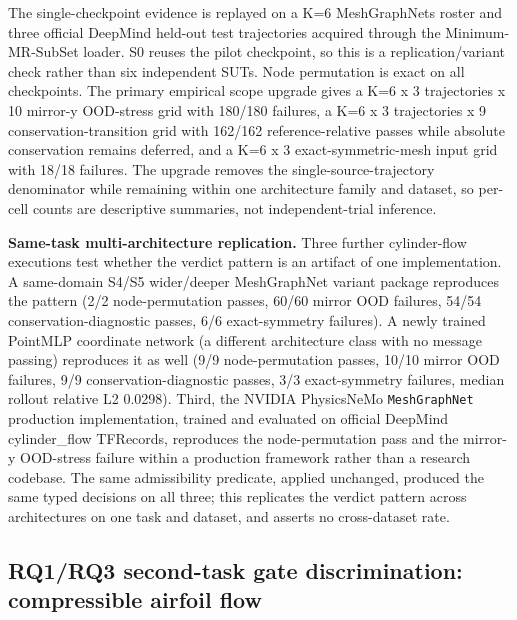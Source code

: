 \documentclass[preprint,12pt]{elsarticle}
\begin{document}
The single-checkpoint evidence is replayed on a K=6 MeshGraphNets roster and three official DeepMind held-out test trajectories acquired through the Minimum-MR-SubSet loader. S0 reuses the pilot checkpoint, so this is a replication/variant check rather than six independent SUTs. Node permutation is exact on all checkpoints. The primary empirical scope upgrade gives a K=6 x 3 trajectories x 10 mirror-y OOD-stress grid with 180/180 failures, a K=6 x 3 trajectories x 9 conservation-transition grid with 162/162 reference-relative passes while absolute conservation remains deferred, and a K=6 x 3 exact-symmetric-mesh input grid with 18/18 failures. The upgrade removes the single-source-trajectory denominator while remaining within one architecture family and dataset, so per-cell counts are descriptive summaries, not independent-trial inference.

\textbf{Same-task multi-architecture replication.} Three further cylinder-flow executions test whether the verdict pattern is an artifact of one implementation. A same-domain S4/S5 wider/deeper MeshGraphNet variant package reproduces the pattern (2/2 node-permutation passes, 60/60 mirror OOD failures, 54/54 conservation-diagnostic passes, 6/6 exact-symmetry failures). A newly trained PointMLP coordinate network (a different architecture class with no message passing) reproduces it as well (9/9 node-permutation passes, 10/10 mirror OOD failures, 9/9 conservation-diagnostic passes, 3/3 exact-symmetry failures, median rollout relative L2 0.0298). Third, the NVIDIA PhysicsNeMo \texttt{MeshGraphNet} production implementation, trained and evaluated on official DeepMind cylinder\_flow TFRecords, reproduces the node-permutation pass and the mirror-y OOD-stress failure within a production framework rather than a research codebase. The same admissibility predicate, applied unchanged, produced the same typed decisions on all three; this replicates the verdict pattern across architectures on one task and dataset, and asserts no cross-dataset rate.

\subsection{RQ1/RQ3 second-task gate discrimination: compressible airfoil flow}
\label{subsec:second-task}
\end{document}
